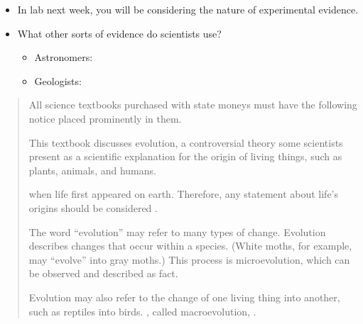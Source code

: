 \begin{frame}
    \begin{itemize}
        \item<1-> In lab next week, you will be considering the nature of
            experimental evidence.
        \item<2-> What other sorts of evidence do scientists use? 
        \begin{itemize}
            \item Astronomers:
            \item Geologists:
        \end{itemize}
    \end{itemize}
\end{frame}


\begin{frame}
    \begin{quote}
        \small
        All science textbooks purchased with state moneys must have the
        following notice placed prominently in them.

        This textbook discusses evolution, a controversial theory some
        scientists present as a scientific explanation for the origin of living
        things, such as plants, animals, and humans. 

         when life first appeared on earth.
        Therefore, any statement about life’s origins should be considered
        .

        The word ``evolution'' may refer to many types of change. Evolution
        describes changes that occur within a species. (White moths, for
        example, may ``evolve'' into gray moths.) This process is
        microevolution, which can be observed and described as fact. 

        Evolution may also refer to the change of one living thing into
        another, such as reptiles into birds. , called
        macroevolution, .
    \end{quote}
\end{frame}



